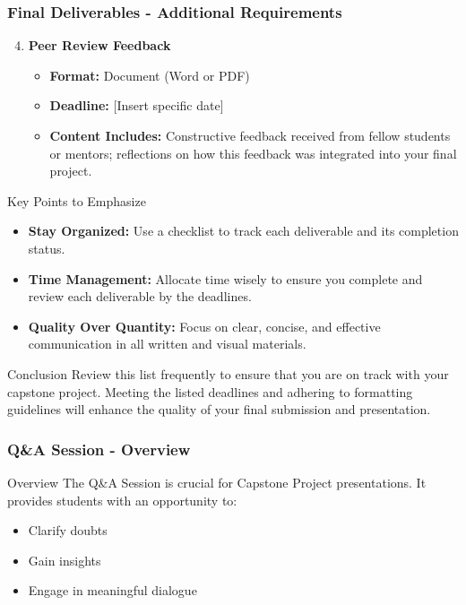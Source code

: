 \documentclass[aspectratio=169]{beamer}
\begin{document}
\begin{frame}[fragile]
    \frametitle{Final Deliverables - Additional Requirements}
    \begin{enumerate}
        \setcounter{enumi}{3}
        \item \textbf{Peer Review Feedback}
        \begin{itemize}
            \item \textbf{Format:} Document (Word or PDF)
            \item \textbf{Deadline:} [Insert specific date]
            \item \textbf{Content Includes:} Constructive feedback received from fellow students or mentors; reflections on how this feedback was integrated into your final project.
        \end{itemize}
    \end{enumerate}

    \begin{block}{Key Points to Emphasize}
        \begin{itemize}
            \item \textbf{Stay Organized:} Use a checklist to track each deliverable and its completion status.
            \item \textbf{Time Management:} Allocate time wisely to ensure you complete and review each deliverable by the deadlines.
            \item \textbf{Quality Over Quantity:} Focus on clear, concise, and effective communication in all written and visual materials.
        \end{itemize}
    \end{block}
    
    \begin{block}{Conclusion}
        Review this list frequently to ensure that you are on track with your capstone project. Meeting the listed deadlines and adhering to formatting guidelines will enhance the quality of your final submission and presentation.
    \end{block}
\end{frame}

\begin{frame}[fragile]
    \frametitle{Q\&A Session - Overview}
    \begin{block}{Overview}
        The Q\&A Session is crucial for Capstone Project presentations.
        It provides students with an opportunity to:
        \begin{itemize}
            \item Clarify doubts
            \item Gain insights
            \item Engage in meaningful dialogue
        \end{itemize}
    \end{block}
\end{frame}
\end{document}
